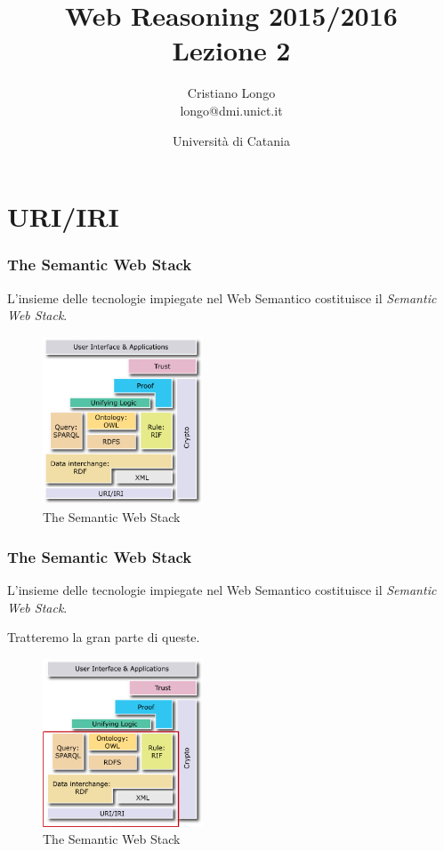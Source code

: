 \documentclass[8pt]{beamer}
\title{Web Reasoning 2015/2016\\
Lezione 2}
\author{Cristiano Longo\\ 
{\small{longo@dmi.unict.it}}}
\date{Universit\`a di Catania}
\begin{document}
\maketitle
\setcounter{tocdepth}{1}

\section{URI/IRI}

\begin{frame}
	\frametitle{The Semantic Web Stack}
	L'insieme delle tecnologie impiegate nel Web Semantico
	costituisce il \emph{Semantic Web Stack}.

	\phantom{Tratteremo la gran parte di queste.}

	\begin{figure}
	    \includegraphics[width=180px]{imgs/Semantic_Web_Stack0.png}
	    \caption{The Semantic Web Stack}
	\end{figure}
\end{frame}

\begin{frame}
	\frametitle{The Semantic Web Stack}
	L'insieme delle tecnologie impiegate nel Web Semantico 
	costituisce il \emph{Semantic Web Stack}.
	
	Tratteremo la gran parte di queste.
	
	\begin{figure}
	    \includegraphics[width=180px]{imgs/Semantic_Web_Stack0all.png}
	    \caption{The Semantic Web Stack} 
	\end{figure}
\end{frame}
\end{document}
